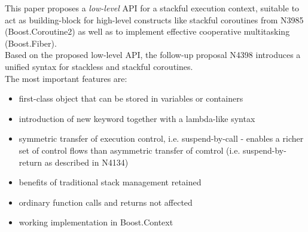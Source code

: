 This paper proposes a \emph{low-level} API for a stackful execution context, suitable
to act as building-block for high-level constructs like stackful coroutines from
N3985\cite{N3985} (Boost.Coroutine2\cite{bcoroutine2}) as well as to implement
effective cooperative multitasking (Boost.Fiber\cite{bfiber}).\\
Based on the proposed low-level API, the follow-up proposal N4398\cite{N4398}
introduces a unified syntax for stackless and stackful coroutines.\\
\newline
The most important features are:
\begin{itemize}
    \item first-class object that can be stored in variables or containers
    \item introduction of new keyword \resumable together with a lambda-like
          syntax
    \item symmetric transfer of execution control, i.e. suspend-by-call -
          enables a richer set of control flows than asymmetric transfer of
          comtrol (i.e. suspend-by-return as described in N4134)
    \item benefits of traditional stack management retained
    \item ordinary function calls and returns not affected
    \item working implementation in Boost.Context\cite{bcontext}
\end{itemize}
